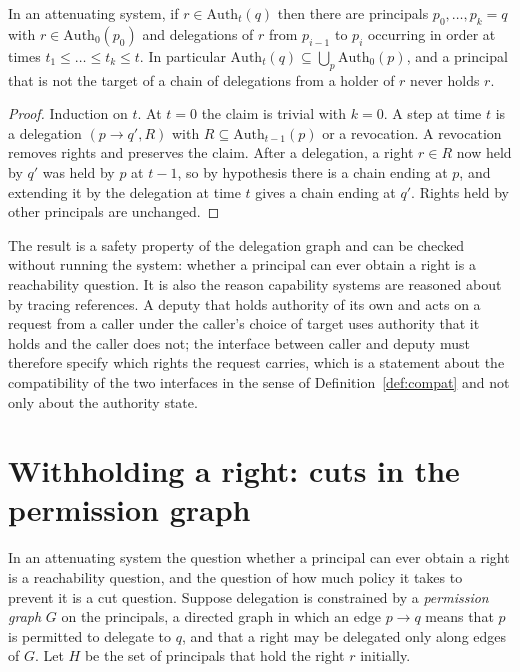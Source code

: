 \begin{newresult}\label{prop:attenuation}
In an attenuating system, if $r\in\mathrm{Auth}_t(q)$ then there are principals $p_0,\dots,p_k=q$ with $r\in\mathrm{Auth}_0(p_0)$ and delegations of $r$ from $p_{i-1}$ to $p_i$ occurring in order at times $t_1\le\dots\le t_k\le t$. In particular $\mathrm{Auth}_t(q)\subseteq\bigcup_p\mathrm{Auth}_0(p)$, and a principal that is not the target of a chain of delegations from a holder of $r$ never holds $r$.
\end{newresult}
\begin{proof}
Induction on $t$. At $t=0$ the claim is trivial with $k=0$. A step at time $t$ is a delegation $(p\to q',R)$ with $R\subseteq\mathrm{Auth}_{t-1}(p)$ or a revocation. A revocation removes rights and preserves the claim. After a delegation, a right $r\in R$ now held by $q'$ was held by $p$ at $t-1$, so by hypothesis there is a chain ending at $p$, and extending it by the delegation at time $t$ gives a chain ending at $q'$. Rights held by other principals are unchanged.
\end{proof}

The result is a safety property of the delegation graph and can be checked without running the system: whether a principal can ever obtain a right is a reachability question. It is also the reason capability systems are reasoned about by tracing references. A deputy that holds authority of its own and acts on a request from a caller under the caller's choice of target uses authority that it holds and the caller does not; the interface between caller and deputy must therefore specify which rights the request carries, which is a statement about the compatibility of the two interfaces in the sense of Definition~\ref{def:compat} and not only about the authority state.


\section{Withholding a right: cuts in the permission graph}\label{sec:cuts}

In an attenuating system the question whether a principal can ever obtain a right is a reachability question, and the question of how much policy it takes to prevent it is a cut question. Suppose delegation is constrained by a \emph{permission graph} $G$ on the principals, a directed graph in which an edge $p\to q$ means that $p$ is permitted to delegate to $q$, and that a right may be delegated only along edges of $G$. Let $H$ be the set of principals that hold the right $r$ initially.

